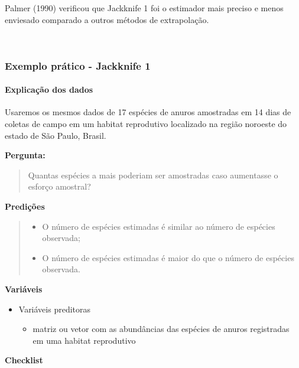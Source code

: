 \documentclass[
]{book}
\providecommand{\tightlist}{%
  \setlength{\itemsep}{0pt}\setlength{\parskip}{0pt}}
\begin{document}
Palmer (1990) verificou que Jackknife 1 foi o estimador mais preciso e menos enviesado comparado a outros métodos de extrapolação.

~

\hypertarget{exemplo-pruxe1tico---jackknife-1}{%
\subsubsection{Exemplo prático - Jackknife 1}\label{exemplo-pruxe1tico---jackknife-1}}

\hypertarget{explicauxe7uxe3o-dos-dados-3}{%
\paragraph{Explicação dos dados}\label{explicauxe7uxe3o-dos-dados-3}}

Usaremos os mesmos dados de 17 espécies de anuros amostradas em 14 dias de coletas de campo em um habitat reprodutivo localizado na região noroeste do estado de São Paulo, Brasil.

\textbf{Pergunta:}

\begin{quote}
Quantas espécies a mais poderiam ser amostradas caso aumentasse o esforço amostral?
\end{quote}

\textbf{Predições}

\begin{quote}
\begin{itemize}
\tightlist
\item
  O número de espécies estimadas é similar ao número de espécies observada;
\item
  O número de espécies estimadas é maior do que o número de espécies observada.
\end{itemize}
\end{quote}

\textbf{Variáveis}

\begin{itemize}
\tightlist
\item
  Variáveis preditoras

  \begin{itemize}
  \tightlist
  \item
    matriz ou vetor com as abundâncias das espécies de anuros registradas em uma habitat reprodutivo
  \end{itemize}
\end{itemize}

\textbf{Checklist}
\end{document}
